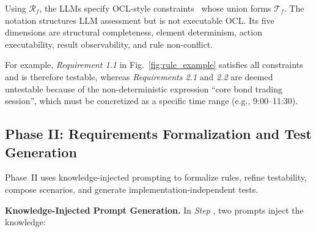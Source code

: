 Using $\mathcal{R}_f$, the LLMs specify OCL-style constraints~\cite{ocl2014object}
whose union forms $\mathcal{T}_f$. The notation structures LLM assessment but
is not executable OCL. Its five dimensions are structural completeness,
element determinism, action executability, result observability, and rule
non-conflict.

For example, \textit{Requirement 1.1} in Fig.~\ref{fig:rule_example} satisfies all constraints and is therefore testable, whereas \textit{Requirements 2.1} and \textit{2.2} are deemed untestable because of the non-deterministic expression ``core bond trading session'', which must be concretized as a specific time range (e.g., 9:00--11:30).












\subsection{Phase II: Requirements Formalization and Test Generation}
\label{sec:test_gen}


Phase~II uses knowledge-injected prompting to formalize rules, refine
testability, compose scenarios, and generate implementation-independent tests.


\noindent
\textbf{Knowledge-Injected Prompt Generation.}
In \textit{Step} , two prompts inject the knowledge:

